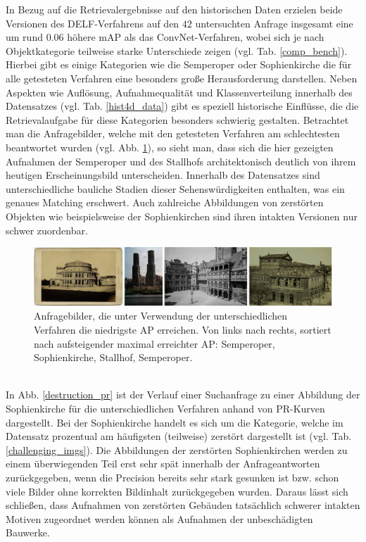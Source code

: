 In Bezug auf die Retrievalergebnisse auf den historischen Daten erzielen beide Versionen des DELF-Verfahrens auf den $42$ untersuchten Anfrage insgesamt eine um rund $0.06$ höhere mAP als das ConvNet-Verfahren, wobei sich je nach Objektkategorie teilweise starke Unterschiede zeigen (vgl. Tab. \ref{comp_bench}). Hierbei gibt es einige Kategorien wie die Semperoper oder Sophienkirche die für alle getesteten Verfahren eine besonders große Herausforderung darstellen. Neben Aspekten wie Auflösung, Aufnahmequalität und Klassenverteilung innerhalb des Datensatzes (vgl. Tab. \ref{hist4d_data}) gibt es speziell historische Einflüsse, die die Retrievalaufgabe für diese Kategorien besonders schwierig gestalten. Betrachtet man die Anfragebilder, welche mit den getesteten Verfahren am schlechtesten beantwortet wurden (vgl. Abb. \ref{worst_queries}), so sieht man, dass sich die hier gezeigten Aufnahmen der Semperoper und des Stallhofs architektonisch deutlich von ihrem heutigen Erscheinungsbild unterscheiden. Innerhalb des Datensatzes sind unterschiedliche bauliche Stadien dieser Sehenswürdigkeiten enthalten, was ein genaues Matching erschwert. Auch zahlreiche Abbildungen von zerstörten Objekten wie beispielsweise der Sophienkirchen sind ihren intakten Versionen nur schwer zuordenbar.  
\begin{figure}[h]
\centering
\includegraphics[scale=0.40]{worst_queries}
\caption{Anfragebilder, die unter Verwendung der unterschiedlichen Verfahren die niedrigste AP erreichen. Von links nach rechts, sortiert nach aufsteigender maximal erreichter AP: Semperoper, Sophienkirche, Stallhof, Semperoper.}
\label{worst_queries}
\end{figure}
\\
In Abb. \ref{destruction_pr} ist der Verlauf einer Suchanfrage zu einer Abbildung der Sophienkirche für die unterschiedlichen Verfahren anhand von PR-Kurven dargestellt. Bei der Sophienkirche handelt es sich um die Kategorie, welche im Datensatz prozentual am häufigsten (teilweise) zerstört dargestellt ist (vgl. Tab. \ref{challenging_imgs}). Die Abbildungen der zerstörten Sophienkirchen werden zu einem überwiegenden Teil erst sehr spät innerhalb der Anfrageantworten zurückgegeben, wenn die Precision bereits sehr stark gesunken ist bzw. schon viele Bilder ohne korrekten Bildinhalt zurückgegeben wurden. Daraus lässt sich schließen, dass Aufnahmen von zerstörten Gebäuden tatsächlich schwerer intakten Motiven zugeordnet werden können als Aufnahmen der unbeschädigten Bauwerke.
